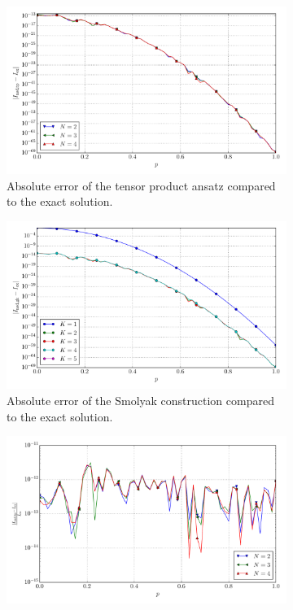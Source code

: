\documentclass[a4paper,10pt]{article}
\begin{document}
\begin{figure}[ht!]
\begin{subfigure}[t]{0.5\linewidth}
    \includegraphics[width=\linewidth]{./plots/tp_sg_12d_conv_p_(1,0,0,0,0,0,0,0,0,0,0,0)_(1,0,0,0,0,0,0,0,0,0,0,0)_err_nsd_tp.pdf}
    \caption{Absolute error of the tensor product ansatz compared to the exact solution.}
    \label{fig:tp_sg_12d_conv_p_100000000000_100000000000_err_nsd_tp}
  \end{subfigure}
  \begin{subfigure}[t]{0.5\linewidth}
    \includegraphics[width=\linewidth]{./plots/tp_sg_12d_conv_p_(1,0,0,0,0,0,0,0,0,0,0,0)_(1,0,0,0,0,0,0,0,0,0,0,0)_err_nsd_gk.pdf}
    \caption{Absolute error of the Smolyak construction compared to the exact solution.}
    \label{fig:tp_sg_12d_conv_p_100000000000_100000000000_err_nsd_gk}
  \end{subfigure}
  \begin{subfigure}[t]{0.5\linewidth}
    \includegraphics[width=\linewidth]{./plots/tp_sg_12d_conv_p_(1,0,0,0,0,0,0,0,0,0,0,0)_(1,0,0,0,0,0,0,0,0,0,0,0)_err_rel_nsd_tp.pdf}

\end{subfigure}
\end{figure}
\end{document}
